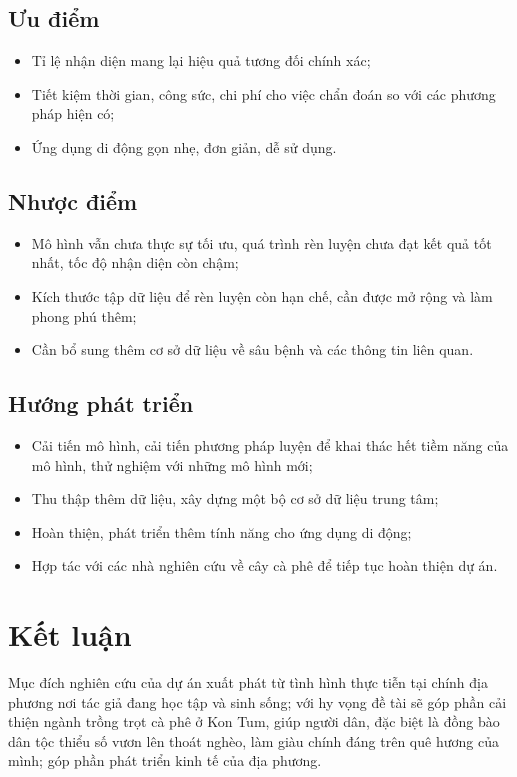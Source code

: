 \documentclass[a4paper,14pt]{extarticle}
\begin{document}
	\subsection{Ưu điểm}
	\begin{itemize}
		\item Tỉ lệ nhận diện mang lại hiệu quả tương đối chính xác;
		\item Tiết kiệm thời gian, công sức, chi phí cho việc chẩn đoán so với các phương pháp hiện có;
		\item Ứng dụng di động gọn nhẹ, đơn giản, dễ sử dụng.
	\end{itemize}

	\subsection{Nhược điểm}
	\begin{itemize}
		\item Mô hình vẫn chưa thực sự tối ưu, quá trình rèn luyện chưa đạt kết quả tốt nhất, tốc độ nhận diện còn chậm;
		\item Kích thước tập dữ liệu để rèn luyện còn hạn chế, cần được mở rộng và làm phong phú thêm;
		\item Cần bổ sung thêm cơ sở dữ liệu về sâu bệnh và các thông tin liên quan.
	\end{itemize}

	\subsection{Hướng phát triển}
	\begin{itemize}
		\item Cải tiến mô hình, cải tiến phương pháp luyện để khai thác hết tiềm năng của mô hình, thử nghiệm với những mô hình mới;
		\item Thu thập thêm dữ liệu, xây dựng một bộ cơ sở dữ liệu trung tâm;
		\item Hoàn thiện, phát triển thêm tính năng cho ứng dụng di động;
		\item Hợp tác với các nhà nghiên cứu về cây cà phê để tiếp tục hoàn thiện dự án.
	\end{itemize}

\section{Kết luận}
Mục đích nghiên cứu của dự án xuất phát từ tình hình thực tiễn tại chính địa phương nơi tác giả đang học tập và sinh sống; với hy vọng đề tài sẽ góp phần cải thiện ngành trồng trọt cà phê ở Kon Tum, giúp người dân, đặc biệt là đồng bào dân tộc thiểu số vươn lên thoát nghèo, làm giàu chính đáng trên quê hương của mình; góp phần phát triển kinh tế của địa phương.
\end{document}
